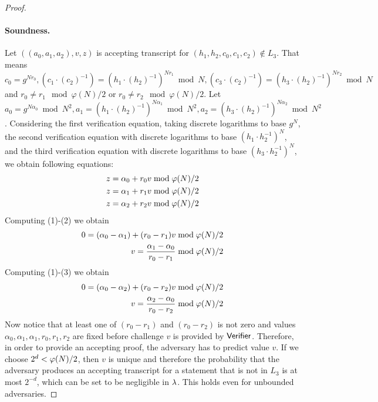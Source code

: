 \begin{proof}
\paragraph{Soundness.} Let $((a_0, a_1, a_2), v, z)$ is accepting transcript for $(h_1, h_2, c_0, c_1, c_2) \notin L_3$. That means $c_0 = g^{Nr_0}, (c_1\cdot (c_2)^{-1}) = (h_1\cdot (h_2)^{-1})^{Nr_1} \bmod N, (c_3\cdot (c_2)^{-1}) = (h_3\cdot (h_2)^{-1})^{Nr_2} \bmod N$ and $r_0 \neq r_1 \mod \varphi(N)/2$ or $r_0 \neq r_2 \mod \varphi(N)/2$. Let $a_0 = g^{N\alpha_0} \bmod N^2, a_1 = (h_1\cdot (h_2)^{-1})^{N\alpha_1} \bmod N^2, a_2 = (h_3\cdot (h_2)^{-1})^{N\alpha_2} \bmod N^2$. Considering the first verification equation, taking discrete logarithms to base $g^N$, the second verification equation with discrete logarithms to base $(h_1 \cdot h_2^{-1})^N$, and the third verification equation with discrete logarithms to base $(h_3 \cdot h_2^{-1})^N$, we obtain following equations:
\begin{align}
z = \alpha_0 + r_0 v \bmod \varphi(N)/2\\
z = \alpha_1 + r_1 v \bmod \varphi(N)/2 \\
z = \alpha_2 + r_2 v \bmod \varphi(N)/2
\end{align}
Computing (1)-(2) we obtain
\begin{align*}
0 = (\alpha_0 - \alpha_1)+ (r_0-r_1)v \bmod \varphi(N)/2 \\
v = \frac{\alpha_1 - \alpha_0}{r_0-r_1} \bmod \varphi(N)/2
\end{align*}
Computing (1)-(3) we obtain
\begin{align*}
0 = (\alpha_0 - \alpha_2)+ (r_0-r_2)v \bmod \varphi(N)/2 \\
v = \frac{\alpha_2 - \alpha_0}{r_0-r_2} \bmod \varphi(N)/2
\end{align*}
Now notice that at least one of $(r_0 - r_1)$ and $(r_0 - r_2)$ is not zero and values $\alpha_0, \alpha_1, \alpha_1, r_0, r_1, r_2$ are fixed before challenge $v$ is provided by $\mathsf{Verifier}$. Therefore, in order to provide an accepting proof, the adversary has to predict value $v$. If we choose $2^d < \varphi(N)/2$, then $v$ is unique and therefore the probability that the adversary produces an accepting transcript for a statement that is not in $L_3$ is at most $2^{-d}$, which can be set to be negligible in $\lambda$. This holds even for unbounded adversaries. 




\end{proof}
